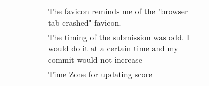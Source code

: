 {\begin{longtable}{R|p{0.8\linewidth}}
		& The favicon reminds me of the "browser tab crashed" favicon.                                                                                                                                                                                                                                                                                                                                                                                                                                                                                                                                                                                                                                                                                     \\
		& The timing of the submission was odd. I would do it at a certain time and my commit would not increase                                                                                                                                                                                                                                                                                                                                                                                                                                                                                                                                                                                                                                           \\
		& Time Zone for updating score        
\end{longtable}
}